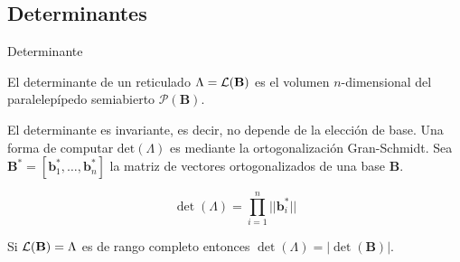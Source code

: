 \subsection{Determinantes}
\begin{frame}{Determinante}
\begin{definition}
El determinante de un reticulado $\Lambda = \mathcal{L}(\mathbf{B})$ es el volumen $n$-dimensional del paralelepípedo semiabierto $\mathcal P(\mathbf B)$.
\end{definition}

El determinante es invariante, es decir, no depende de la elección de base. Una forma de computar $\text{det}(\Lambda)$ es mediante la ortogonalización Gran-Schmidt. Sea $\mathbf B^* = [\mathbf b_1^*, \dots, \mathbf b_n^*]$ la matriz de vectores ortogonalizados de una base $\mathbf B$.

\[
\det(\Lambda) = \prod_{i = 1}^n ||\mathbf b_i^*||
\]

Si $\mathcal{L}(\mathbf{B}) = \Lambda$ es de rango completo entonces $\det(\Lambda) = |\det(\mathbf B)|$.

\end{frame}


